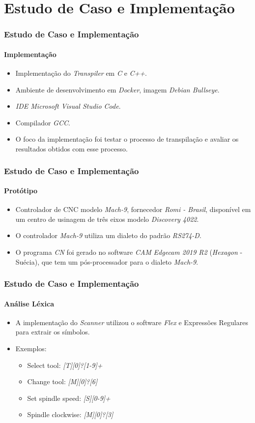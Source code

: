 \documentclass[aspectratio=169]{beamer}
\begin{document}
{\section{Estudo de Caso e Implementação}

\begin{frame}
  \frametitle{Estudo de Caso e Implementação}
  \framesubtitle{Implementação}

  \begin{itemize}
    \item Implementação do \emph{Transpiler} em \emph{C} e \emph{C++}.
    \item Ambiente de desenvolvimento em \emph{Docker}, 
          imagem \emph{Debian Bullseye}.
    \item \emph{IDE Microsoft Visual Studio Code}.
    \item Compilador \emph{GCC}.
    \item O foco da implementação foi testar o processo de transpilação 
          e avaliar os resultados obtidos com esse processo.
  \end{itemize}

\end{frame}


\begin{frame}
  \frametitle{Estudo de Caso e Implementação}
  \framesubtitle{Protótipo}

  \begin{itemize}
    \item Controlador de CNC modelo \emph{Mach-9}, fornecedor 
          \emph{Romi - Brasil}, disponível em um centro de usinagem de
           três eixos modelo \emph{Discovery 4022}.
    \item O controlador \emph{Mach-9} utiliza um dialeto do padrão 
          \emph{RS274-D}.
    \item O programa \emph{CN} foi gerado no software \emph{CAM} 
          \emph{Edgecam 2019 R2} (\emph{Hexagon} - Suécia), que tem um 
          pós-processador para o dialeto \emph{Mach-9}.
  \end{itemize}

\end{frame}


\begin{frame}
  \frametitle{Estudo de Caso e Implementação}
  \framesubtitle{Análise Léxica}
  \begin{itemize}
    \item A implementação do \emph{Scanner} utilizou o software 
          \emph{Flex} e Expressões Regulares para extrair os símbolos.
    \item Exemplos:
      \begin{itemize}
        \item Select tool: \emph{[T][0]?[1-9]+}
        \item Change tool: \emph{[M][0]?[6]}
        \item Set spindle speed: \emph{[S][0-9]+}
        \item Spindle clockwise: \emph{[M][0]?[3]}
      \end{itemize}  
  \end{itemize}


\end{frame}}
\end{document}
